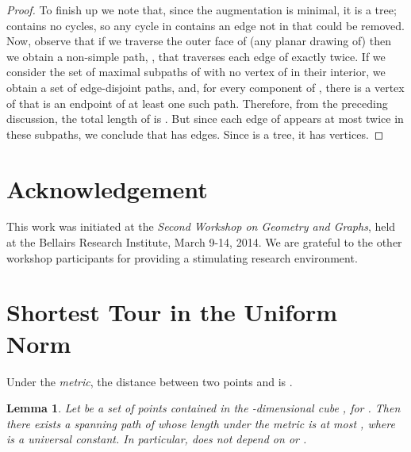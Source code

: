 \documentclass[11pt]{patmorin}
\newtheorem{lemma}[theorem]{Lemma}
\begin{document}
\begin{proof}
To finish up we note that, since the augmentation  is minimal,
it is a tree;  contains no cycles, so any cycle in  contains an edge not in  that could be removed.  Now, observe that if we traverse the outer face of (any planar drawing of)  then we obtain a non-simple path, , that traverses each edge of  exactly twice. If we consider the set of maximal subpaths of  with no vertex of  in their interior, we obtain a set of  edge-disjoint paths,  and, for every component  of , there is a vertex of  that is an endpoint of at least one such path.  Therefore, from the preceding discussion, the total length of  is .  But since each edge of  appears at most twice in these subpaths, we conclude that  has  edges.  Since  is a tree, it has  vertices.
\end{proof}


\section*{Acknowledgement}

This work was initiated at the \emph{Second Workshop on Geometry and Graphs},
held at the Bellairs Research Institute, March 9-14, 2014.  We are
grateful to the other workshop participants for providing a stimulating
research environment.







\appendix
\newpage
\section{Shortest Tour in the Uniform Norm}
\label{app:uniform-norm}

Under the \emph{ metric}, the distance between two points  and  is .  

\begin{lemma}\label{lemma:tsp}
  Let  be a set of  points contained in the -dimensional
  cube , for .  Then there exists a spanning path of 
  whose length under the  metric is at most ,
  where  is a universal constant. In particular,  does not depend
  on  or .
\end{lemma}
\end{document}
